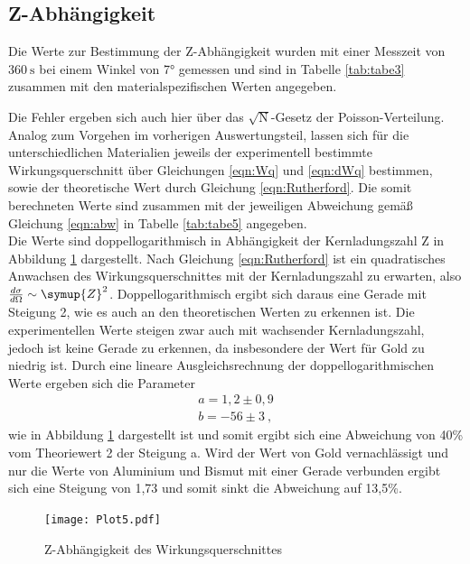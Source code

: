 \subsection{Z-Abhängigkeit}
Die Werte zur Bestimmung der Z-Abhängigkeit wurden mit einer Messzeit von $\SI{360}{\second}$
bei einem Winkel von 7° gemessen und sind in Tabelle
\ref{tab:tabe3} zusammen mit den materialspezifischen Werten angegeben.

Die Fehler ergeben sich auch hier über das $\sqrt{\text{N}}$-Gesetz der Poisson-Verteilung.
Analog zum Vorgehen im vorherigen Auswertungsteil, lassen sich für die unterschiedlichen
Materialien jeweils der experimentell bestimmte Wirkungsquerschnitt über Gleichungen \eqref{eqn:Wq}
und \eqref{eqn:dWq} bestimmen, sowie der theoretische Wert durch Gleichung \eqref{eqn:Rutherford}.
Die somit berechneten Werte sind zusammen mit der jeweiligen Abweichung gemäß
Gleichung \eqref{eqn:abw} in Tabelle \ref{tab:tabe5}
angegeben.\\

Die Werte sind doppellogarithmisch in Abhängigkeit der Kernladungszahl Z in Abbildung \ref{fig:plot5}
dargestellt.
Nach Gleichung \eqref{eqn:Rutherford} ist ein quadratisches Anwachsen des Wirkungsquerschnittes
mit der Kernladungszahl zu erwarten, also ${\frac{d\sigma}{d\Omega} \sim \symup{Z}^2}$.
Doppellogarithmisch ergibt sich daraus eine Gerade mit Steigung 2, wie es auch
an den theoretischen Werten zu erkennen ist. Die experimentellen Werte steigen zwar auch mit
wachsender Kernladungszahl, jedoch ist keine Gerade zu erkennen, da insbesondere der Wert für Gold
zu niedrig ist.
Durch eine lineare Ausgleichsrechnung der doppellogarithmischen Werte ergeben sich die Parameter
\begin{align*}
  a =  1,2 \pm 0,9 \\
  b =  -56 \pm 3 \: ,
\end{align*}
wie in Abbildung \ref{fig:plot5} dargestellt ist und somit ergibt sich eine Abweichung von 40\% vom Theoriewert 2 der Steigung a. Wird der Wert
von Gold vernachlässigt und nur die Werte von Aluminium und Bismut mit einer Gerade verbunden
ergibt sich eine Steigung von 1,73 und somit sinkt die Abweichung auf 13,5\%.
\begin{figure}
  \centering
  \texttt{[image: Plot5.pdf]}
  \caption{Z-Abhängigkeit des Wirkungsquerschnittes}
  \label{fig:plot5}
\end{figure}
